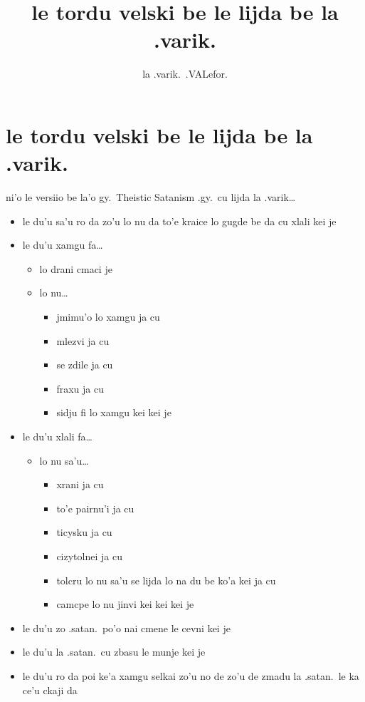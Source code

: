 \documentclass{article}
\title{le tordu velski be le lijda be la .varik.}
\author{la .varik.\ .VALefor.}
\begin{document}
\maketitle

\section{le tordu velski be le lijda be la .varik.}

ni'o le versiio be la'o gy.\ Theistic Satanism .gy.\ cu lijda la .varik\ldots

\begin{itemize}
	\item le du'u sa'u ro da zo'u lo nu da to'e kraice lo gugde be da cu xlali kei je
	\item le du'u xamgu fa\ldots{}
	\begin{itemize}
		\item lo drani cmaci je
		\item lo nu\ldots{}
		\begin{itemize}
			\item jmimu'o lo xamgu ja cu
			\item mlezvi ja cu
			\item se zdile ja cu
			\item fraxu ja cu
			\item sidju fi lo xamgu kei kei je
		\end{itemize}
	\end{itemize}
	\item le du'u xlali fa\ldots{}
	\begin{itemize}
		\item lo nu sa'u\ldots{}
		\begin{itemize}
			\item xrani ja cu
			\item to'e pairnu'i ja cu
			\item ticysku ja cu
			\item cizytolnei ja cu
			\item tolcru lo nu sa'u se lijda lo na du be ko'a kei ja cu
			\item camcpe lo nu jinvi kei kei kei je
		\end{itemize}
	\end{itemize}
	\item le du'u zo .satan.\ po'o nai cmene le cevni kei je
	\item le du'u la .satan.\ cu zbasu le munje kei je
	\item le du'u ro da poi ke'a xamgu selkai zo'u no de zo'u de zmadu la .satan.\ le ka ce'u ckaji da
\end{itemize}
\end{document}
